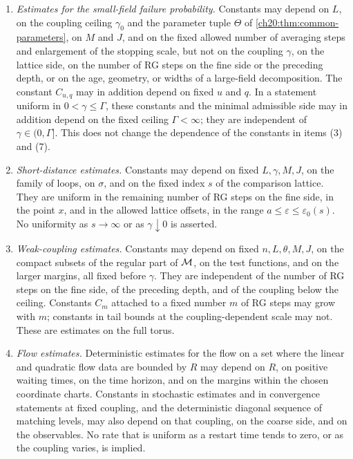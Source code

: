 \begin{definition}
\begin{enumerate}
\item[(4)] \emph{Estimates for the small-field failure probability.} Constants may depend on $L$, on the coupling ceiling $\gamma_0$ and the parameter tuple $\Theta$ of \cref{ch20:thm:common-parameters}, on $M$ and $J$, and on the fixed allowed number of averaging steps and enlargement of the stopping scale, but not on the coupling $\gamma$, on the lattice side, on the number of RG steps on the fine side or the preceding depth, or on the age, geometry, or widths of a large-field decomposition. The constant $C_{u,q}$ may in addition depend on fixed $u$ and $q$. In a statement uniform in $0<\gamma\le\Gamma$, these constants and the minimal admissible side may in addition depend on the fixed ceiling $\Gamma<\infty$; they are independent of $\gamma\in(0,\Gamma]$. This does not change the dependence of the constants in items (3) and (7).
\item[(5)] \emph{Short-distance estimates.} Constants may depend on fixed $L,\gamma,M,J$, on the family of loops, on $\sigma$, and on the fixed index $s$ of the comparison lattice. They are uniform in the remaining number of RG steps on the fine side, in the point $x$, and in the allowed lattice offsets, in the range $a\le\varepsilon\le\varepsilon_0(s)$. No uniformity as $s\to\infty$ or as $\gamma\downarrow0$ is asserted.
\item[(6)] \emph{Weak-coupling estimates.} Constants may depend on fixed $n,L,\theta,M,J$, on the compact subsets of the regular part of $\mathcal M$, on the test functions, and on the larger margins, all fixed before $\gamma$. They are independent of the number of RG steps on the fine side, of the preceding depth, and of the coupling below the ceiling. Constants $C_m$ attached to a fixed number $m$ of RG steps may grow with $m$; constants in tail bounds at the coupling-dependent scale may not. These are estimates on the full torus.
\item[(7)] \emph{Flow estimates.} Deterministic estimates for the flow on a set where the linear and quadratic flow data are bounded by $R$ may depend on $R$, on positive waiting times, on the time horizon, and on the margins within the chosen coordinate charts. Constants in stochastic estimates and in convergence statements at fixed coupling, and the deterministic diagonal sequence of matching levels, may also depend on that coupling, on the coarse side, and on the observables. No rate that is uniform as a restart time tends to zero, or as the coupling varies, is implied.
\end{enumerate}
\end{definition}

